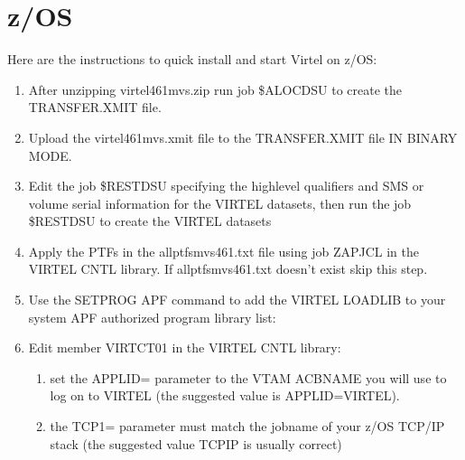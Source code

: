 \documentclass[letterpaper,10pt,english]{sphinxmanual}
\begin{document}
\section{z/OS}
\label{\detokenize{Getting_Started:z-os}}
\sphinxAtStartPar
Here are the instructions to quick install and start Virtel on z/OS:
\begin{enumerate}
%
\item {} 
\sphinxAtStartPar
After unzipping virtel461mvs.zip run job \$ALOCDSU to create the TRANSFER.XMIT file.

\item {} 
\sphinxAtStartPar
Upload the virtel461mvs.xmit file to the TRANSFER.XMIT file IN BINARY MODE.

\item {} 
\sphinxAtStartPar
Edit the job \$RESTDSU specifying the high\sphinxhyphen{}level qualifiers and SMS or volume serial information for the VIRTEL datasets, then run the job \$RESTDSU to create the VIRTEL datasets

\item {} 
\sphinxAtStartPar
Apply the PTFs in the allptfs\sphinxhyphen{}mvs461.txt file using job ZAPJCL in the VIRTEL CNTL library. If allptfs\sphinxhyphen{}mvs461.txt doesn’t exist skip this step.

\item {} 
\sphinxAtStartPar
Use the SETPROG APF command to add the VIRTEL LOADLIB to your system APF authorized program library list:

\begin{sphinxVerbatim}[commandchars=\\\{\}]
 
\end{sphinxVerbatim}

\item {} 
\sphinxAtStartPar
Edit member VIRTCT01 in the VIRTEL CNTL library:
\begin{enumerate}
%
\item {} 
\sphinxAtStartPar
set the APPLID= parameter to the VTAM ACBNAME you will use to log
on to VIRTEL (the suggested value is APPLID=VIRTEL).

\item {} 
\sphinxAtStartPar
the TCP1= parameter must match the jobname of your z/OS
TCP/IP stack (the suggested value TCPIP is usually correct)


\end{enumerate}
\end{enumerate}
\end{document}
